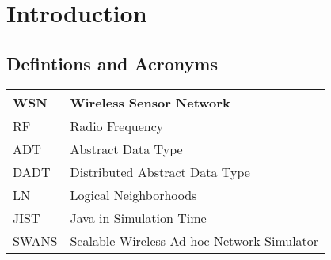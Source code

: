\chapter{Introduction}

\section{Defintions and Acronyms}

\begin{tabular}{| l |p{9cm}|}
\hline
WSN \T \B & Wireless Sensor Network \\
\hline
RF \T \B & Radio Frequency \\
\hline
ADT \T \B & Abstract Data Type \\
\hline
DADT \T \B & Distributed Abstract Data Type \\
\hline
LN \T \B & Logical Neighborhoods \\
\hline
JIST \T \B & Java in Simulation Time \\
\hline
SWANS \T \B & Scalable Wireless Ad hoc Network Simulator \\
\hline

\end{tabular}

